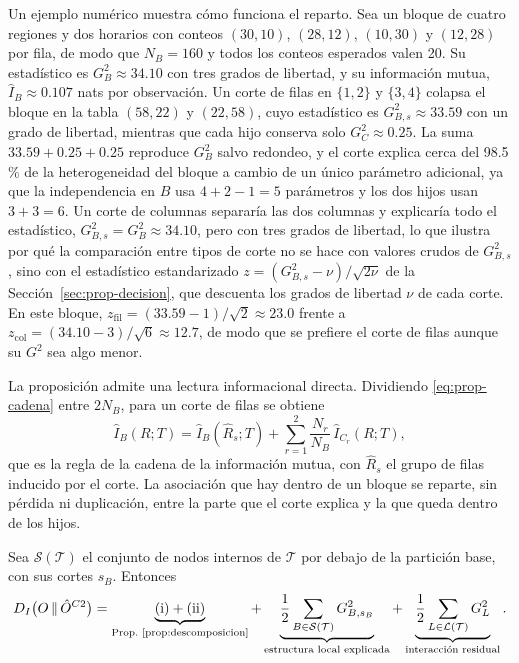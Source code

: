 Un ejemplo numérico muestra cómo funciona el reparto. Sea un bloque de cuatro
regiones y dos horarios con conteos $(30,10)$, $(28,12)$, $(10,30)$ y $(12,28)$
por fila, de modo que $N_B = 160$ y todos los conteos esperados valen 20. Su
estadístico es $G^2_B\approx 34.10$ con tres grados de libertad, y su
información mutua, $\hat I_B\approx 0.107$ nats por observación. Un corte de
filas en $\{1,2\}$ y $\{3,4\}$ colapsa el bloque en la tabla $(58,22)$ y
$(22,58)$, cuyo estadístico es $G^2_{B,s}\approx 33.59$ con un grado de libertad,
mientras que cada hijo conserva solo $G^2_C\approx 0.25$. La suma
$33.59 + 0.25 + 0.25$ reproduce $G^2_B$ salvo redondeo, y el corte explica cerca
del 98.5\,\% de la heterogeneidad del bloque a cambio de un único parámetro
adicional, ya que la independencia en $B$ usa $4+2-1=5$ parámetros y los dos
hijos usan $3+3=6$. Un corte de columnas separaría las dos columnas y explicaría
todo el estadístico, $G^2_{B,s} = G^2_B\approx 34.10$, pero con tres grados de
libertad, lo que ilustra por qué la comparación entre tipos de corte no se hace
con valores crudos de $G^2_{B,s}$, sino con el estadístico estandarizado
$z = (G^2_{B,s}-\nu)/\sqrt{2\nu}$ de la Sección~\ref{sec:prop-decision}, que
descuenta los grados de libertad $\nu$ de cada corte. En este bloque,
$z_{\mathrm{fil}} = (33.59-1)/\sqrt{2}\approx 23.0$ frente a
$z_{\mathrm{col}} = (34.10-3)/\sqrt{6}\approx 12.7$, de modo que se prefiere el
corte de filas aunque su $G^2$ sea algo menor.

La proposición admite una lectura informacional directa. Dividiendo
\eqref{eq:prop-cadena} entre $2N_B$, para un corte de filas se obtiene
\begin{equation}\label{eq:prop-regla-cadena}
  \hat I_B(R;T) = \hat I_B(\hat R_s;T)
  + \sum_{r=1}^{2}\frac{N_r}{N_B}\,\hat I_{C_r}(R;T),
\end{equation}
que es la regla de la cadena de la información mutua, con $\hat R_s$ el grupo de
filas inducido por el corte. La asociación que hay dentro de un bloque se
reparte, sin pérdida ni duplicación, entre la parte que el corte explica y la
que queda dentro de los hijos.

\begin{corolario}\label{cor:stcc}
Sea $\mathcal{S}(\mathcal{T})$ el conjunto de nodos internos de $\mathcal{T}$
por debajo de la partición base, con sus cortes $s_B$. Entonces
\begin{equation}\label{eq:prop-desc-total}
  D_I\bigl(O\,\|\,\hat O^{C2}\bigr)
  = \underbrace{\text{(i)} + \text{(ii)}}_{\text{Prop.~\ref{prop:descomposicion}}}
  + \underbrace{\frac12\sum_{B\in\mathcal{S}(\mathcal{T})} G^2_{B,s_B}}_{\text{estructura local explicada}}
  + \underbrace{\frac12\sum_{L\in\mathcal{L}(\mathcal{T})} G^2_L}_{\text{interacción residual}} .
\end{equation}
\end{corolario}

